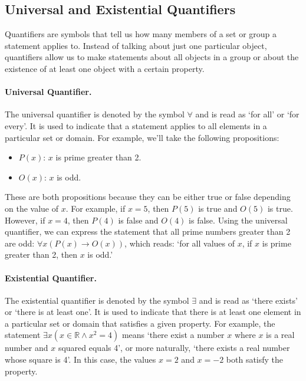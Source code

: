 \documentclass[a4paper, twoside]{article}
\newcommand{\R}{\mathbb{R}}
\newcommand{\rarrow}{\rightarrow}
\begin{document}
\newpage

\subsection{Universal and Existential Quantifiers}
Quantifiers are symbols that tell us how many members of a set or group a statement applies to. Instead of talking about just one particular object, quantifiers allow us to make statements about all objects in a group or about the existence of at least one object with a certain property.

\paragraph{Universal Quantifier.}
The universal quantifier is denoted by the symbol \(\forall\) and is read as `for all' or `for every'. It is used to indicate that a statement applies to all elements in a particular set or domain. For example, we'll take the following propositions:

\begin{itemize}
    \item \(P(x)\): \(x\) is prime greater than 2.
    \item \(O(x)\): \(x\) is odd.
\end{itemize}

These are both propositions because they can be either true or false depending on the value of \(x\). For example, if \(x = 5\), then \(P(5)\) is true and \(O(5)\) is true. However, if \(x = 4\), then \(P(4)\) is false and \(O(4)\) is false. Using the universal quantifier, we can express the statement that all prime numbers greater than 2 are odd: \(\forall x (P(x) \rarrow O(x))\), which reads: `for all values of \(x\), if \(x\) is prime greater than 2, then \(x\) is odd.'

\paragraph{Existential Quantifier.}
The existential quantifier is denoted by the symbol \(\exists\) and is read as `there exists' or `there is at least one'. It is used to indicate that there is at least one element in a particular set or domain that satisfies a given property. For example, the statement \(\exists x ( x \in \R \land x^2 = 4)\) means `there exist a number \(x\) where \(x\) is a real number and \(x\) squared equals 4', or more naturally, `there exists a real number whose square is 4'. In this case, the values \(x = 2\) and \(x = -2\) both satisfy the property.
\end{document}
